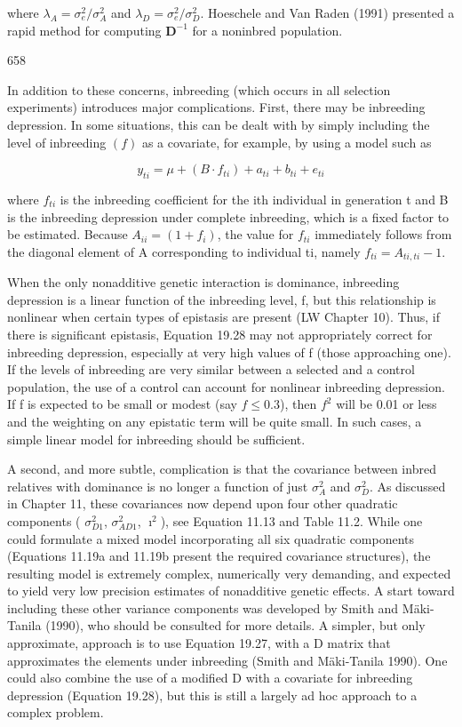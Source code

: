 \documentclass{article}
\begin{document}
where  $ \lambda_A = \sigma_e^2 / \sigma_A^2 $ and  $ \lambda_D = \sigma_e^2 / \sigma_D^2 $. Hoeschele and Van Raden (1991) presented a rapid method for computing  $ \mathbf{D}^{-1} $ for a noninbred population.

658

In addition to these concerns, inbreeding (which occurs in all selection experiments) introduces major complications. First, there may be inbreeding depression. In some situations, this can be dealt with by simply including the level of inbreeding  $ (f) $ as a covariate, for example, by using a model such as

\begin{equation}
y_{ti}=\mu+\left(B\cdot f_{ti}\right)+a_{ti}+b_{ti}+e_{ti}
\tag{19.28}
\label{eq:19_28}
\end{equation}

where  $ f_{ti} $ is the inbreeding coefficient for the ith individual in generation t and B is the inbreeding depression under complete inbreeding, which is a fixed factor to be estimated. Because  $ A_{ii} = (1 + f_i) $, the value for  $ f_{ti} $ immediately follows from the diagonal element of A corresponding to individual ti, namely  $ f_{ti} = A_{ti,ti} - 1 $.

When the only nonadditive genetic interaction is dominance, inbreeding depression is a linear function of the inbreeding level, f, but this relationship is nonlinear when certain types of epistasis are present (LW Chapter 10). Thus, if there is significant epistasis, Equation 19.28 may not appropriately correct for inbreeding depression, especially at very high values of f (those approaching one). If the levels of inbreeding are very similar between a selected and a control population, the use of a control can account for nonlinear inbreeding depression. If f is expected to be small or modest (say  $ f \leq 0.3 $), then  $ f^2 $ will be 0.01 or less and the weighting on any epistatic term will be quite small. In such cases, a simple linear model for inbreeding should be sufficient.

A second, and more subtle, complication is that the covariance between inbred relatives with dominance is no longer a function of just  $ \sigma_A^2 $ and  $ \sigma_D^2 $. As discussed in Chapter 11, these covariances now depend upon four other quadratic components ( $ \sigma_{D1}^2 $,  $ \sigma_{AD1}^2 $,  $ \imath^2 $), see Equation 11.13 and Table 11.2. While one could formulate a mixed model incorporating all six quadratic components (Equations 11.19a and 11.19b present the required covariance structures), the resulting model is extremely complex, numerically very demanding, and expected to yield very low precision estimates of nonadditive genetic effects. A start toward including these other variance components was developed by Smith and Mäki-Tanila (1990), who should be consulted for more details. A simpler, but only approximate, approach is to use Equation 19.27, with a D matrix that approximates the elements under inbreeding (Smith and Mäki-Tanila 1990). One could also combine the use of a modified D with a covariate for inbreeding depression (Equation 19.28), but this is still a largely ad hoc approach to a complex problem.
\end{document}
